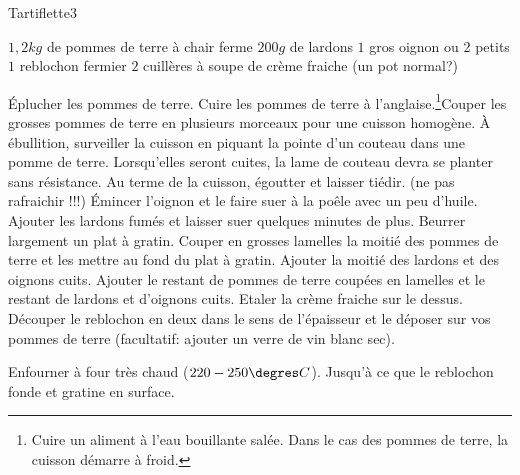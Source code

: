 \begin{recette}{Tartiflette}{3}{}{}

\begin{ingredients}
\ingredient $1,2\unit{kg}$ de pommes de terre à chair ferme
\ingredient $200\unit{g}$ de lardons
\ingredient $1$ gros oignon ou 2 petits
\ingredient $1$ reblochon fermier
\ingredient $2$ cuillères à soupe de crème fraiche (un pot normal?)
\end{ingredients}

\begin{preparation}
\etape Éplucher les pommes de terre. Cuire les pommes de terre à l'anglaise.\footnote{Cuire un aliment à l'eau bouillante salée. Dans le cas des pommes de terre, la cuisson démarre à froid.}Couper les grosses pommes de terre en plusieurs morceaux pour une cuisson homogène.
\etape À ébullition, surveiller la cuisson en piquant la pointe d'un couteau dans une pomme de terre. Lorsqu'elles seront cuites, la lame de couteau devra se planter sans résistance.
\etape Au terme de la cuisson, égoutter et laisser tiédir. (ne pas rafraichir !!!)
\etape Émincer l'oignon et le faire suer à la poêle avec un peu d'huile.
\etape Ajouter les lardons fumés et laisser suer quelques minutes de plus.
\etape Beurrer largement un plat à gratin.
\etape Couper en grosses lamelles la moitié des pommes de terre et les mettre au fond du plat à gratin.
\etape Ajouter la moitié des lardons et des oignons cuits.
\etape Ajouter le restant de pommes de terre coupées en lamelles et le restant de lardons et d'oignons cuits. Etaler la crème fraiche sur le dessus.
\etape Découper le reblochon en deux dans le sens de l'épaisseur et le déposer sur vos pommes de terre (facultatif: ajouter un verre de vin blanc sec).

\end{preparation}

\begin{cuisson}
Enfourner à four très chaud ($220-250\degres C$). Jusqu'à ce que le reblochon fonde et gratine en surface.
\end{cuisson}
\end{recette}

